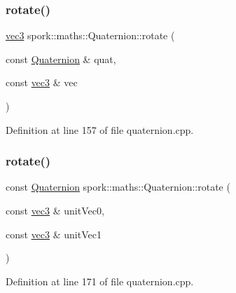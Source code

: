 \subsubsection{\texorpdfstring{rotate()}{rotate()}\hspace{0.1cm}{\footnotesize\ttfamily [1/3]}}
{\footnotesize\ttfamily \hyperlink{structspork_1_1maths_1_1vec3}{vec3} spork\+::maths\+::\+Quaternion\+::rotate (\begin{DoxyParamCaption}\item[{const \hyperlink{structspork_1_1maths_1_1_quaternion}{Quaternion} \&}]{quat,  }\item[{const \hyperlink{structspork_1_1maths_1_1vec3}{vec3} \&}]{vec }\end{DoxyParamCaption})\hspace{0.3cm}{\ttfamily [static]}}



Definition at line 157 of file quaternion.\+cpp.

\mbox{\label{structspork_1_1maths_1_1_quaternion_a7746e864306c3844725c96575f7282cd}} 
\subsubsection{\texorpdfstring{rotate()}{rotate()}\hspace{0.1cm}{\footnotesize\ttfamily [2/3]}}
{\footnotesize\ttfamily const \hyperlink{structspork_1_1maths_1_1_quaternion}{Quaternion} spork\+::maths\+::\+Quaternion\+::rotate (\begin{DoxyParamCaption}\item[{const \hyperlink{structspork_1_1maths_1_1vec3}{vec3} \&}]{unit\+Vec0,  }\item[{const \hyperlink{structspork_1_1maths_1_1vec3}{vec3} \&}]{unit\+Vec1 }\end{DoxyParamCaption})\hspace{0.3cm}{\ttfamily [static]}}



Definition at line 171 of file quaternion.\+cpp.

\mbox{\label{structspork_1_1maths_1_1_quaternion_ae769335030acc9889db670ec3fcf9da2}} 
